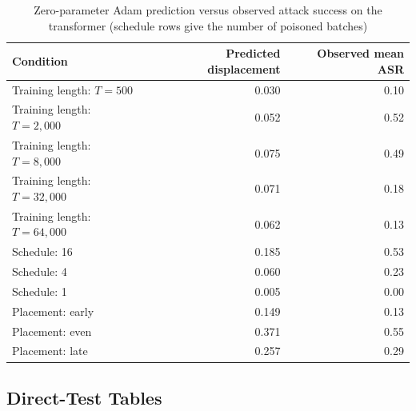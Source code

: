 \documentclass{article} %
\begin{document}
\begin{table}[ht]
\caption{Zero-parameter Adam prediction versus observed attack success on the transformer (schedule rows give the number of poisoned batches)}
\label{tab:adam-mech}
\begin{center}
\begin{tabular}{lrr}
\toprule
Condition & Predicted displacement & Observed mean ASR \\
\midrule
Training length: $T=500$ & 0.030 & 0.10 \\
Training length: $T=2{,}000$ & 0.052 & 0.52 \\
Training length: $T=8{,}000$ & 0.075 & 0.49 \\
Training length: $T=32{,}000$ & 0.071 & 0.18 \\
Training length: $T=64{,}000$ & 0.062 & 0.13 \\
Schedule: 16 & 0.185 & 0.53 \\
Schedule: 4 & 0.060 & 0.23 \\
Schedule: 1 & 0.005 & 0.00 \\
Placement: early & 0.149 & 0.13 \\
Placement: even & 0.371 & 0.55 \\
Placement: late & 0.257 & 0.29 \\
\bottomrule
\end{tabular}
\end{center}
\end{table}

\subsection{Direct-Test Tables}
\label{app:direct}
\end{document}

